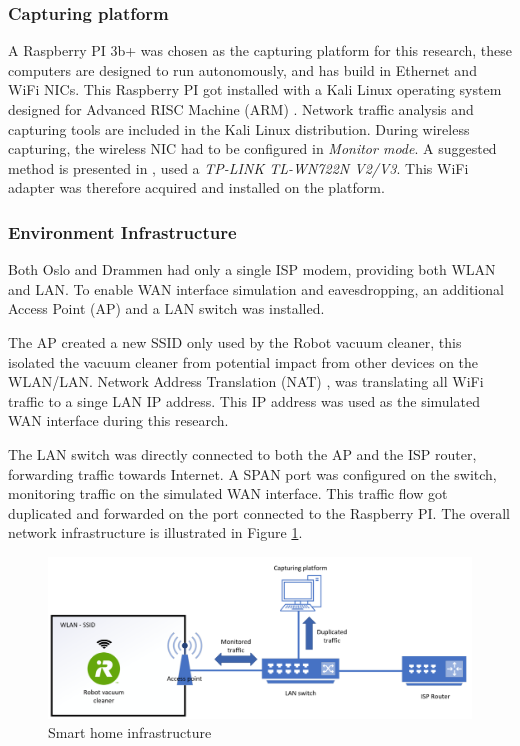 \subsubsection{Capturing platform}
A Raspberry PI 3b+ was chosen as the capturing platform for this research, these computers are designed to run autonomously, and has build in Ethernet and WiFi NICs. This Raspberry PI got installed with a Kali Linux operating system designed for Advanced RISC Machine (ARM) \cite{kalidownload}. Network traffic analysis and capturing tools are included in the Kali Linux distribution. During wireless capturing, the wireless NIC had to be configured in \textit{Monitor mode}. A suggested method is presented in  \cite{Kali_monitormode_guide}, used a \textit{TP-LINK TL-WN722N V2/V3}. This WiFi adapter was therefore acquired and installed on the platform. 

\subsubsection{Environment Infrastructure}
Both Oslo and Drammen had only a single ISP modem, providing both WLAN and LAN. To enable WAN interface simulation and eavesdropping, an additional Access Point (AP) and a LAN switch was installed.

The AP created a new SSID only used by the Robot vacuum cleaner, this isolated the vacuum cleaner from potential impact from other devices on the WLAN/LAN. Network Address Translation (NAT) \cite{rfc1631nat}, was translating all WiFi traffic to a singe LAN IP address. This IP address was used as the simulated WAN interface during this research.

The LAN switch was directly connected to both the AP and the ISP router, forwarding traffic towards Internet. A SPAN port was configured on the switch, monitoring traffic on the simulated WAN interface. This traffic flow got duplicated and forwarded on the port connected to the Raspberry PI. The overall network infrastructure is illustrated in Figure \ref{fig:WLAN_LAN_setup}.

\begin{figure}[H]
    \centering
    \includegraphics[width=\textwidth]{figures/WLAN_LAN_setup.png}
    \caption{Smart home infrastructure}
    \label{fig:WLAN_LAN_setup}
\end{figure}


